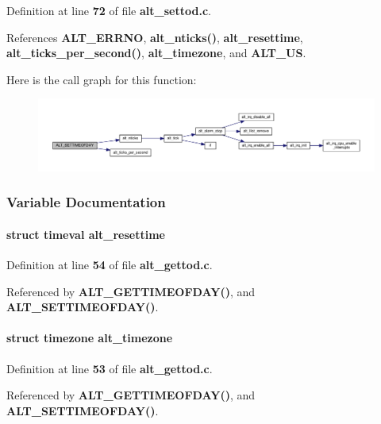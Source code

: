 Definition at line {\bf 72} of file {\bf alt\+\_\+settod.\+c}.



References {\bf A\+L\+T\+\_\+\+E\+R\+R\+NO}, {\bf alt\+\_\+nticks()}, {\bf alt\+\_\+resettime}, {\bf alt\+\_\+ticks\+\_\+per\+\_\+second()}, {\bf alt\+\_\+timezone}, and {\bf A\+L\+T\+\_\+\+US}.



Here is the call graph for this function\+:
\nopagebreak
\begin{figure}[H]
\begin{center}
\leavevmode
\includegraphics[width=350pt]{dc/dd5/alt__settod_8c_a897ea6d87afb7dc8fe66766e83fc0101_cgraph}
\end{center}
\end{figure}




\subsubsection{Variable Documentation}
\paragraph[{alt\+\_\+resettime}]{\setlength{\rightskip}{0pt plus 5cm}struct timeval alt\+\_\+resettime}\label{alt__settod_8c_a871bb39e3efcef7ed5960c633edc06af}


Definition at line {\bf 54} of file {\bf alt\+\_\+gettod.\+c}.



Referenced by {\bf A\+L\+T\+\_\+\+G\+E\+T\+T\+I\+M\+E\+O\+F\+D\+A\+Y()}, and {\bf A\+L\+T\+\_\+\+S\+E\+T\+T\+I\+M\+E\+O\+F\+D\+A\+Y()}.

\paragraph[{alt\+\_\+timezone}]{\setlength{\rightskip}{0pt plus 5cm}struct timezone alt\+\_\+timezone}\label{alt__settod_8c_a4a36ab50424b296f44e353306e335151}


Definition at line {\bf 53} of file {\bf alt\+\_\+gettod.\+c}.



Referenced by {\bf A\+L\+T\+\_\+\+G\+E\+T\+T\+I\+M\+E\+O\+F\+D\+A\+Y()}, and {\bf A\+L\+T\+\_\+\+S\+E\+T\+T\+I\+M\+E\+O\+F\+D\+A\+Y()}.

